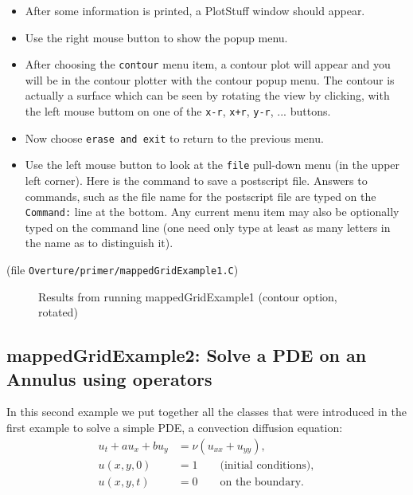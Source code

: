 \documentclass{article}
\begin{document}
\begin{itemize}
 \item After some information is printed, a PlotStuff window should appear.
 \item Use the right mouse button to show the popup menu.
 \item After choosing the {\tt contour} menu item, a contour plot will appear and you will 
     be in the contour plotter with the contour popup menu.
     The contour is actually a surface which can be seen by rotating the view
     by clicking, with the left mouse buttom on one of the {\tt x-r}, {\tt x+r}, {\tt y-r}, ... buttons.
 \item Now choose {\tt erase and exit} to return to the previous menu.
 \item Use the left mouse button to look at the {\tt file} pull-down menu (in the upper left corner).
  Here is the command to save a postscript file.
   Answers to commands, such as the file name for the postscript file
   are typed on the {\tt Command:} line at the bottom. Any current menu item may also be optionally
   typed on the command line (one need only type at least as many letters in the name as to distinguish it).
\end{itemize}

(file {\tt Overture/primer/mappedGridExample1.C})



{\footnotesize
{}
}
\begin{figure}[htb]
  \begin{center}
  \caption{Results from running mappedGridExample1 (contour option, rotated)} 
  \end{center}
\end{figure}

\vfill\eject
\subsection{mappedGridExample2: Solve a PDE on an Annulus using operators}

In this second example we put together all the classes that were introduced
in the first example to solve a simple PDE, a convection diffusion equation:
\begin{align*}
    u_t + a u_x + b u_y & = \nu( u_{xx} + u_{yy} ), \\
        u(x,y,0) & = 1    \qquad \text{(initial conditions)}, \\
        u(x,y,t) & = 0    \qquad \text{on the boundary}.
\end{align*}
\end{document}
